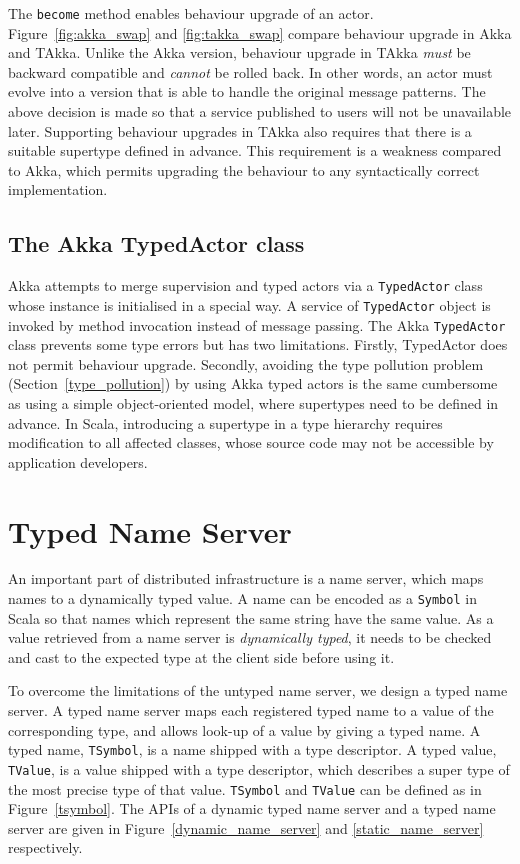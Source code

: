 The {\tt become} method enables behaviour upgrade of an  actor.  Figure~\ref{fig:akka_swap}
and \ref{fig:takka_swap} compare behaviour upgrade in Akka and TAkka.  Unlike
the Akka version, behaviour upgrade in TAkka {\it  must} be backward 
compatible and {\it cannot} be rolled back.  In other words, 
an actor must evolve into a version that is able to handle the original
message patterns.  The above decision is made so that a service published to 
users will not be unavailable later.  Supporting behaviour upgrades in TAkka also
requires that there is a suitable supertype defined in advance. This requirement
is a weakness compared to Akka, which permits upgrading the behaviour to 
any syntactically correct implementation.

\subsection{The Akka TypedActor class}
Akka attempts to merge supervision and typed actors via a {\tt TypedActor} class
whose instance is initialised in a special way. A service 
of {\tt TypedActor} object is invoked by method invocation instead of message 
passing.   The Akka {\tt TypedActor} class prevents some type errors but has 
two limitations. Firstly, TypedActor does not permit behaviour upgrade. 
Secondly, avoiding the type pollution problem (Section~\ref{type_pollution}) by 
using Akka typed actors is the same cumbersome as using a simple 
object-oriented model, where supertypes need to be defined in advance. In 
Scala, introducing a supertype in a type hierarchy requires modification to all 
affected classes, whose source code may not be accessible by application 
developers.

\section{Typed Name Server}
\label{nameserver}

An important part of distributed infrastructure is a name server, 
which maps names to a dynamically typed value.  
A name can be encoded as a {\tt Symbol} in Scala so that names
which represent the same string have the same value.  As a value retrieved from 
a name server is {\it dynamically typed}, it needs to be checked and 
cast to the expected type at the client side before using it.  

To overcome the limitations of the untyped name server, we design 
a typed name server.  A typed name server maps each registered typed name to a value of the
corresponding type, and allows look-up of a value by giving a typed name.
A typed name, {\tt TSymbol}, is a name shipped with a type descriptor.  A 
typed value, {\tt TValue}, is a value shipped with a type descriptor, which
describes a super type of the most precise type of that value.  
{\tt TSymbol} and {\tt TValue} can be defined as in Figure~\ref{tsymbol}.
The APIs of a dynamic typed name server and a typed name server 
are given in Figure~\ref{dynamic_name_server} and \ref{static_name_server} respectively.

